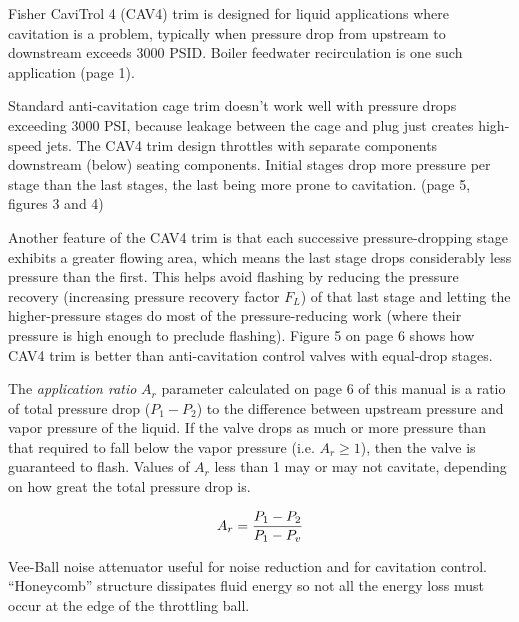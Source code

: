 












Fisher CaviTrol 4 (CAV4) trim is designed for liquid applications where cavitation is a problem, typically when pressure drop from upstream to downstream exceeds 3000 PSID.  Boiler feedwater recirculation is one such application (page 1).

\vskip 10pt

Standard anti-cavitation cage trim doesn't work well with pressure drops exceeding 3000 PSI, because leakage between the cage and plug just creates high-speed jets.  The CAV4 trim design throttles with separate components downstream (below) seating components.  Initial stages drop more pressure per stage than the last stages, the last being more prone to cavitation.  (page 5, figures 3 and 4)

Another feature of the CAV4 trim is that each successive pressure-dropping stage exhibits a greater flowing area, which means the last stage drops considerably less pressure than the first.  This helps avoid flashing by reducing the pressure recovery (increasing pressure recovery factor $F_L$) of that last stage and letting the higher-pressure stages do most of the pressure-reducing work (where their pressure is high enough to preclude flashing).  Figure 5 on page 6 shows how CAV4 trim is better than anti-cavitation control valves with equal-drop stages.

\vskip 10pt

The {\it application ratio }$A_r$ parameter calculated on page 6 of this manual is a ratio of total pressure drop ($P_1 - P_2$) to the difference between upstream pressure and vapor pressure of the liquid.  If the valve drops as much or more pressure than that required to fall below the vapor pressure (i.e. $A_r \geq 1$), then the valve is guaranteed to flash.   Values of $A_r$ less than 1 may or may not cavitate, depending on how great the total pressure drop is.

$$A_r = {P_1 - P_2 \over P_1 - P_{v}}$$

\vskip 20pt

Vee-Ball noise attenuator useful for noise reduction and for cavitation control.  ``Honeycomb'' structure dissipates fluid energy so not all the energy loss must occur at the edge of the throttling ball.

